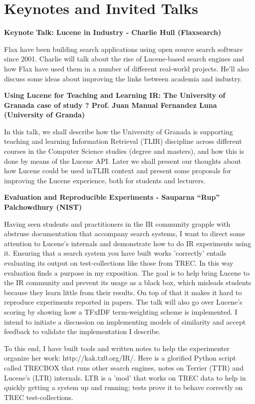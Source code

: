 \documentclass[12pt]{article}
\begin{document}
\begin{sloppypar}
\section{Keynotes and Invited Talks}

{\bf Keynote Talk: Lucene in Industry - Charlie Hull (Flaxsearch)}

Flax have been building search applications using open source search software since 2001. Charlie will talk about the rise of Lucene-based search engines and how Flax have used them in a number of different real-world projects. He'll also discuss some ideas about improving the links between academia and industry.


{\bf Using Lucene for Teaching and Learning IR: The 
University of Granada case of study ? Prof. Juan Manual Fernandez Luna (University of Granda) }

In this talk, we shall describe how the University of Granada is 
supporting teaching and learning Information Retrieval (TLIR) discipline 
across different courses in the Computer Science studies (degree and 
masters), and how this is done by means of the Lucene API. Later we 
shall present our thoughts about how Lucene could be used inTLIR context 
and present some proposals for improving the Lucene experience, both for 
students and lecturers.


{\bf Evaluation and Reproducible Experiments - Sauparna ``Rup'' Palchowdhury (NIST) }

Having seen students and practitioners in the IR community grapple with abstruse documentation that accompany search systems, I want to direct some attention to Lucene's internals and demonstrate how to do IR experiments using it. Ensuring that a search system you have built works 'correctly' entails evaluating its output on test-collections like those from TREC. In this way evaluation finds a purpose in my exposition. The goal is to help bring Lucene to the IR community and prevent its usage as a black box, which misleads students because they learn little from their results. On top of that it makes it hard to reproduce experiments reported in papers. The talk will also go over Lucene's scoring by showing how a TFxIDF term-weighting scheme is implemented. I intend to initiate a discussion on implementing models of similarity and accept feedback to validate the implementation I describe.

To this end, I have built tools and written notes to help the experimenter organize her work: http://kak.tx0.org/IR/. Here is a
glorified Python script called TRECBOX that runs other search engines, notes on Terrier (TTR) and Lucene's (LTR) internals. LTR is a 'mod' that works on TREC data to help in quickly getting a system up and running; tests prove it to behave correctly on TREC test-collections.



\end{sloppypar}
\end{document}
